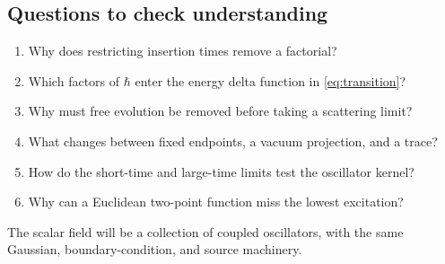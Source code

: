 \documentclass[11pt]{article}
\begin{document}
\subsection*{Questions to check understanding}
\begin{enumerate}
\item Why does restricting insertion times remove a factorial?
\item Which factors of \(\hbar\) enter the energy delta function in
\eqref{eq:transition}?
\item Why must free evolution be removed before taking a scattering limit?
\item What changes between fixed endpoints, a vacuum projection, and a trace?
\item How do the short-time and large-time limits test the oscillator kernel?
\item Why can a Euclidean two-point function miss the lowest excitation?
\end{enumerate}
The scalar field will be a collection of coupled oscillators, with
the same Gaussian, boundary-condition, and source machinery.
\end{document}
